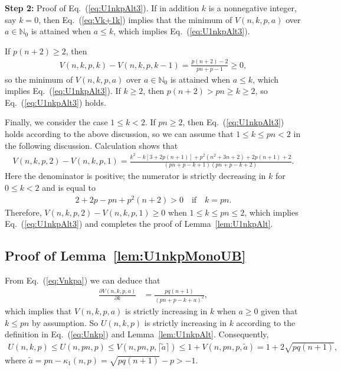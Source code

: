 \documentclass[aop]{imsart}
\theoremstyle{plain}
\theoremstyle{remark}
\newcommand{\bbN}{\mathbb{N}}
\newcommand{\1}{\operatorname{\uppercase\expandafter{\romannumeral1}}}
\newcommand{\2}{\operatorname{\uppercase\expandafter{\romannumeral2}}}
\newcommand{\3}{\operatorname{\uppercase\expandafter{\romannumeral3}}}
\newcommand{\4}{\operatorname{\uppercase\expandafter{\romannumeral4}}}
\newcommand{\5}{\operatorname{\uppercase\expandafter{\romannumeral5}}}
\newcommand{\6}{\operatorname{\uppercase\expandafter{\romannumeral6}}}
\newcommand{\7}{\operatorname{\uppercase\expandafter{\romannumeral7}}}
\newcommand{\8}{\operatorname{\uppercase\expandafter{\romannumeral8}}}
\newcommand{\9}{\operatorname{\uppercase\expandafter{\romannumeral9}}}
\newcommand{\eref}[1]{Eq.~\textup{(\ref{#1})}}
\newcommand{\lref}[1]{Lemma~\ref{#1}}
\begin{document}
\begin{appendix}
\textbf{Step 2:} Proof of \eref{eq:U1nkpAlt3}.	
If in addition $k$ is  a nonnegative integer, say $k=0$, then \eref{eq:Vk+1k} implies that the minimum of $V(n,k,p,a)$ over $a\in \bbN_0$  is attained when $a\leq k$, which implies \eref{eq:U1nkpAlt3}. 

If $p(n+2)\geq 2$, then 
\begin{align}
V(n,k,p,k)-V(n,k,p,k-1)=\frac{p(n+2)-2}{p n+p -1}\geq 0,
\end{align}
so the minimum of $V(n,k,p,a)$ over $a\in \bbN_0$ is attained when $a\leq k$, which implies \eref{eq:U1nkpAlt3}. 
If $k\geq 2$, then $p(n+2)>p n\geq k\geq 2$, so \eref{eq:U1nkpAlt3} holds. 

Finally, we consider the case $1\leq k< 2$. If $p n\geq 2$, then \eref{eq:U1nkpAlt3} holds according to the above discussion, so we can assume that $1\leq k\leq p n< 2$ in the following discussion. Calculation shows that
\begin{align}
V(n,k,p,2)-V(n,k,p,1)=\frac{k^2-k[3+2p(n+1)]+p^2(n^2+3n+2)+2p(n+1)+2}{(p n+p-k+1)(p n+p-k+2)}.
\end{align}
Here the denominator is positive; the numerator is strictly decreasing in $k$ for $0\leq k< 2$ and is equal to 
\begin{align}
2+2p -p n+p^2 (n+2)>0 \quad \mbox{if}\quad k=p n.
\end{align}
Therefore, $V(n,k,p,2)-V(n,k,p,1)\geq 0$ when $1\leq k\leq p n\leq 2$, which implies \eref{eq:U1nkpAlt3} and completes the proof of \lref{lem:U1nkpAlt}. 


\subsection{Proof of \lref{lem:U1nkpMonoUB}}
From \eref{eq:Vnkpa} we can deduce that
	\begin{align}
	\frac{\partial V(n,k,p,a)}{\partial k}&=\frac{p q (n+1)}{(p n+p-k+a)^2},
	\end{align}
which implies that	$V(n,k,p,a)$ is strictly increasing in $k$ when $a\geq 0$ given that $ k\leq p n$ by assumption. So 	$U(n,k,p)$ is strictly increasing in $k$ according to the definition in \eref{eq:Unkp} and \lref{lem:U1nkpAlt}. Consequently,	
	\begin{align}
	U(n,k,p)\leq U(n,pn,p)\leq V(n,pn,p,\lceil\tilde{a}\rceil)\leq 1+V(n,pn,p,\tilde{a})= 1+2\sqrt{p q (n+1)},
	\end{align}	
	where $\tilde{a}=pn-\kappa_1(n,p)=\sqrt{pq(n+1)}-p>-1$.	
	

\end{appendix}
\end{document}
